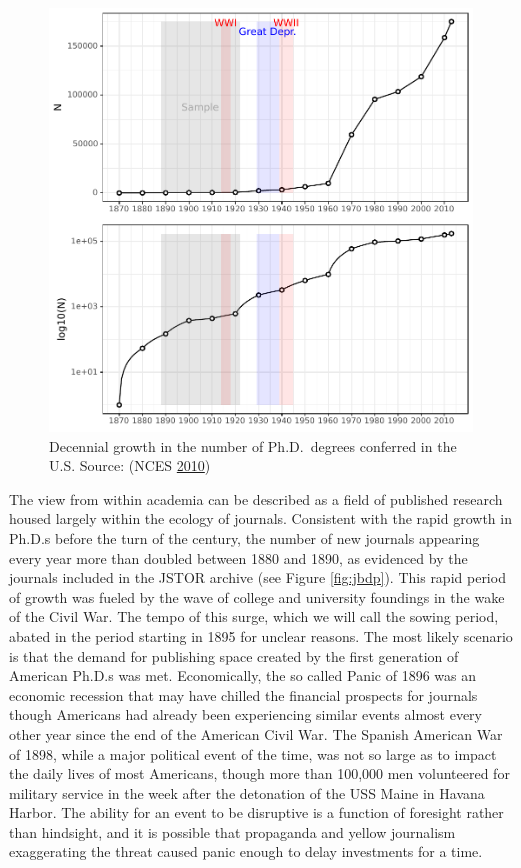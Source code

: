 \documentclass[]{book}
\theoremstyle{definition}
\theoremstyle{definition}
\theoremstyle{definition}
\theoremstyle{remark}
\begin{document}
\begin{figure}

{\centering \includegraphics[width=0.9\linewidth]{04_files/figure-latex/nces2phd-1} 

}

\caption{Decennial growth in the number of Ph.D.~degrees conferred
in the U.S. Source: (NCES \protect\hyperlink{ref-NCES2010Table}{2010})}\label{fig:nces2phd}
\end{figure}

The view from within academia can be described as a field of published
research housed largely within the ecology of journals. Consistent with
the rapid growth in Ph.D.s before the turn of the century, the number of
new journals appearing every year more than doubled between 1880 and
1890, as evidenced by the journals included in the JSTOR archive (see
Figure \ref{fig:jbdp}). This rapid period of growth was fueled by the
wave of college and university foundings in the wake of the Civil War.
The tempo of this surge, which we will call the sowing period, abated in
the period starting in 1895 for unclear reasons. The most likely
scenario is that the demand for publishing space created by the first
generation of American Ph.D.s was met. Economically, the so called Panic
of 1896 was an economic recession that may have chilled the financial
prospects for journals though Americans had already been experiencing
similar events almost every other year since the end of the American
Civil War. The Spanish American War of 1898, while a major political
event of the time, was not so large as to impact the daily lives of most
Americans, though more than 100,000 men volunteered for military service
in the week after the detonation of the USS Maine in Havana Harbor. The
ability for an event to be disruptive is a function of foresight rather
than hindsight, and it is possible that propaganda and yellow journalism
exaggerating the threat caused panic enough to delay investments for a
time.
\end{document}
